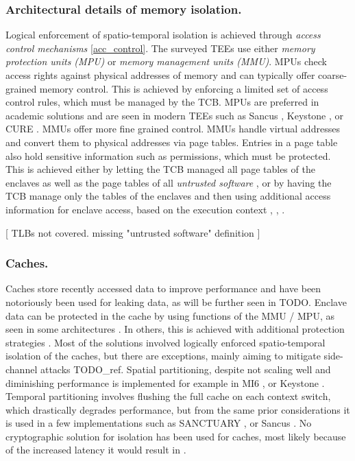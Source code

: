 \documentclass[runningheads,a4paper]{uwsese}
\begin{document}
\subsubsection{Architectural details of memory isolation.}

Logical enforcement of spatio-temporal isolation is achieved through
\emph{access control mechanisms} \ref{acc_control}. The surveyed TEEs use
either \emph{memory protection units (MPU)} or \emph{memory management units
(MMU)}. MPUs check access rights against physical addresses of memory and can
typically offer coarse-grained memory control. This is achieved by enforcing a
limited set of access control rules, which must be managed by the TCB. MPUs are
preferred in academic solutions and are seen in modern TEEs such as Sancus
\cite{tee_sancus}, Keystone \cite{tee_keystone}, or CURE \cite{tee_cure}. MMUs
offer more fine grained control. MMUs handle virtual addresses and convert them
to physical addresses via page tables. Entries in a page table also hold
sensitive information such as permissions, which must be protected. This is
achieved either by letting the TCB managed all page tables of the enclaves as
well as the page tables of all \emph{untrusted software} \cite{tee_ha-vmsi}, or
by having the TCB manage only the tables of the enclaves and then using
additional access information for enclave access, based on the execution
context \cite{intel_tdx}, \cite{arm_tz}, \cite{arm_realms} \cite{tee_hw_sup}.


[ TLBs not covered. missing "untrusted software" definition ]

\subsubsection{Caches.}

Caches store recently accessed data to improve performance and have been
notoriously been used for leaking data, as will be further seen in TODO.
Enclave data can be protected in the cache by using functions of the MMU / MPU,
as seen in some architectures \cite{intel_sgx}. In others, this is achieved
with additional protection strategies \cite{arm_tz}. Most of the solutions
involved logically enforced spatio-temporal isolation of the caches, but there
are exceptions, mainly aiming to mitigate side-channel attacks TODO\_ref.
Spatial partitioning, despite not scaling well and diminishing performance is
implemented for example in MI6 \cite{tee_mi6}, or Keystone \cite{tee_keystone}.
Temporal partitioning involves flushing the full cache on each context switch,
which drastically degrades performance, but from the same prior considerations
it is used in a few implementations such as SANCTUARY \cite{tee_sanctuary}, or
Sancus \cite{tee_sancus}. No cryptographic solution for isolation has been used
for caches, most likely because of the increased latency it would result in
\cite{tee_hw_sup}.
\end{document}
